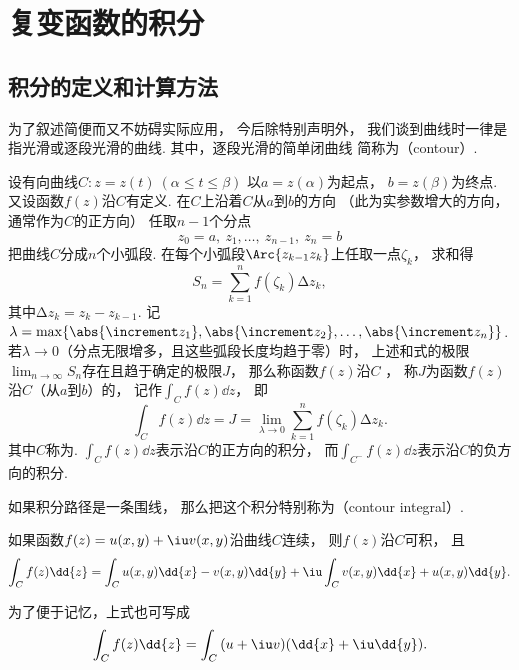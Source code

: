 \section{复变函数的积分}
\subsection{积分的定义和计算方法}
为了叙述简便而又不妨碍实际应用，
今后除特别声明外，
我们谈到曲线时一律是指光滑或逐段光滑的曲线.
其中，逐段光滑的简单闭曲线
简称为（contour）.

\begin{definition}
设有向曲线\(C: z = z(t)\ (\alpha \leq t \leq \beta)\)
以\(a = z(\alpha)\)为起点，
\(b = z(\beta)\)为终点.
又设函数\(f(z)\)沿\(C\)有定义.
在\(C\)上沿着\(C\)从\(a\)到\(b\)的方向
（此为实参数增大的方向，通常作为\(C\)的正方向）
任取\(n-1\)个分点\begin{equation*}
	z_0 = a,\ z_1,\dots,\ z_{n-1},\ z_n = b
\end{equation*}
把曲线\(C\)分成\(n\)个小弧段.
在每个小弧段\(\Arc{z_{k-1} z_k}\)上任取一点\(\zeta_k\)，
求和得\begin{equation*}
	S_n = \sum_{k=1}^n{f(\zeta_k) \increment z_k},
\end{equation*}
其中\(\increment z_k = z_k - z_{k-1}\).
记\(\lambda = \max\{\abs{\increment z_1},\abs{\increment z_2},\dots,\abs{\increment z_n}\}\).
若\(\lambda\to0\)（分点无限增多，且这些弧段长度均趋于零）时，
上述和式的极限\(\lim_{n\to\infty}S_n\)存在且趋于确定的极限\(J\)，
那么称函数\(f(z)\)沿\(C\) ，
称\(J\)为函数\(f(z)\)沿\(C\)（从\(a\)到\(b\)）的，
记作\(\int_C f(z) \dd{z}\)，
即\begin{equation*}
	\int_C f(z) \dd{z} = J = \lim_{\lambda\to0} \sum_{k=1}^n{f(\zeta_k) \increment z_k}.
\end{equation*}
其中\(C\)称为.
\(\int_C f(z) \dd{z}\)表示沿\(C\)的正方向的积分，
而\(\int_{C^-}{f(z)\dd{z}}\)表示沿\(C\)的负方向的积分.
\end{definition}

如果积分路径是一条围线，
那么把这个积分特别称为（contour integral）.

\begin{theorem}
如果函数\(f(z)=u(x,y)+\iu v(x,y)\)沿曲线\(C\)连续，
则\(f(z)\)沿\(C\)可积，
且\begin{equation*}
	\int_C f(z) \dd{z}
	= \int_C u(x,y)\dd{x} - v(x,y)\dd{y}
	+ \iu \int_C v(x,y)\dd{x} + u(x,y)\dd{y}.
\end{equation*}

为了便于记忆，上式也可写成\begin{equation*}
\int_C f(z) \dd{z} = \int_C{(u+\iu v)(\dd{x}+\iu\dd{y})}.
\end{equation*}
\end{theorem}

